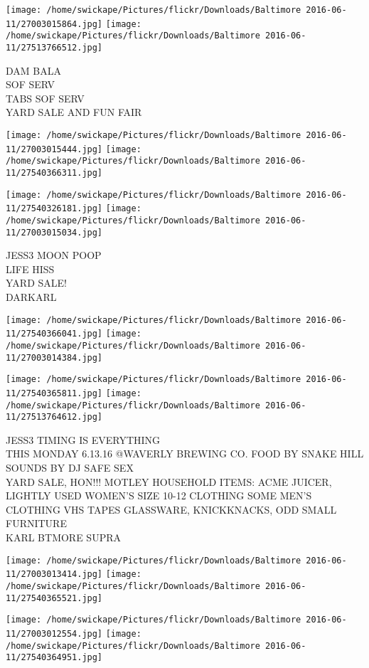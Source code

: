 \documentclass[10pt,letterpaper]{article}
\begin{document}
\texttt{[image: /home/swickape/Pictures/flickr/Downloads/Baltimore 2016-06-11/27003015864.jpg]}
\texttt{[image: /home/swickape/Pictures/flickr/Downloads/Baltimore 2016-06-11/27513766512.jpg]}

DAM BALA\\
SOF SERV\\
TABS SOF SERV\\
YARD SALE AND FUN FAIR
\pagebreak

\texttt{[image: /home/swickape/Pictures/flickr/Downloads/Baltimore 2016-06-11/27003015444.jpg]}
\texttt{[image: /home/swickape/Pictures/flickr/Downloads/Baltimore 2016-06-11/27540366311.jpg]}

\texttt{[image: /home/swickape/Pictures/flickr/Downloads/Baltimore 2016-06-11/27540326181.jpg]}
\texttt{[image: /home/swickape/Pictures/flickr/Downloads/Baltimore 2016-06-11/27003015034.jpg]}

JESS3 MOON POOP\\
LIFE HISS\\
YARD SALE!\\
DARKARL
\pagebreak

\texttt{[image: /home/swickape/Pictures/flickr/Downloads/Baltimore 2016-06-11/27540366041.jpg]}
\texttt{[image: /home/swickape/Pictures/flickr/Downloads/Baltimore 2016-06-11/27003014384.jpg]}

\texttt{[image: /home/swickape/Pictures/flickr/Downloads/Baltimore 2016-06-11/27540365811.jpg]}
\texttt{[image: /home/swickape/Pictures/flickr/Downloads/Baltimore 2016-06-11/27513764612.jpg]}

JESS3 TIMING IS EVERYTHING\\
THIS MONDAY 6.13.16 @WAVERLY BREWING CO. FOOD BY SNAKE HILL SOUNDS BY DJ SAFE SEX\\
YARD SALE, HON!!! MOTLEY HOUSEHOLD ITEMS: ACME JUICER, LIGHTLY USED WOMEN'S SIZE 10{-}12 CLOTHING SOME MEN'S CLOTHING VHS TAPES GLASSWARE, KNICKKNACKS, ODD SMALL FURNITURE\\
KARL BTMORE SUPRA
\pagebreak

\texttt{[image: /home/swickape/Pictures/flickr/Downloads/Baltimore 2016-06-11/27003013414.jpg]}
\texttt{[image: /home/swickape/Pictures/flickr/Downloads/Baltimore 2016-06-11/27540365521.jpg]}

\texttt{[image: /home/swickape/Pictures/flickr/Downloads/Baltimore 2016-06-11/27003012554.jpg]}
\texttt{[image: /home/swickape/Pictures/flickr/Downloads/Baltimore 2016-06-11/27540364951.jpg]}
\end{document}
